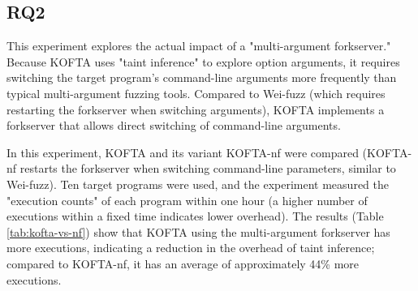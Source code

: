 \fi %


\subsection{RQ2}

This experiment explores the actual impact of a "multi-argument forkserver." Because KOFTA uses "taint inference" to explore option arguments, it requires switching the target program's command-line arguments more frequently than typical multi-argument fuzzing tools. Compared to Wei-fuzz (which requires restarting the forkserver when switching arguments), KOFTA implements a forkserver that allows direct switching of command-line arguments. %

In this experiment, KOFTA and its variant KOFTA-nf were compared (KOFTA-nf restarts the forkserver when switching command-line parameters, similar to Wei-fuzz). Ten target programs were used, and the experiment measured the "execution counts" of each program within one hour (a higher number of executions within a fixed time indicates lower overhead). The results (Table \ref{tab:kofta-vs-nf}) show that KOFTA using the multi-argument forkserver has more executions, indicating a reduction in the overhead of taint inference; compared to KOFTA-nf, it has an average of approximately 44\% more executions.

